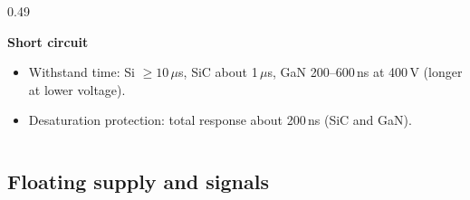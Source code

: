 \begin{frame}
\begin{columns}[T]
\begin{column}{0.49\textwidth}
\begin{itemize}
			\end{itemize}
			\textbf{Short circuit}
			\begin{itemize}
				\item Withstand time: Si $\geq10\,\mu$s, SiC about 1\,$\mu$s, GaN 200--600\,ns at 400\,V (longer at lower voltage).
				\item Desaturation protection: total response about 200\,ns (SiC and GaN).
			\end{itemize}
		\end{column}
	\end{columns}
\end{frame}

\subsection{Floating supply and signals}

